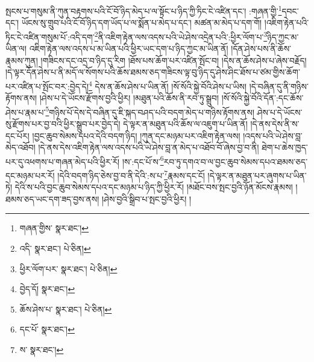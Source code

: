 སྤངས་པ་གསུམ་ནི་ཀུན་བརྟགས་པའི་ངོ་བོ་ཉིད་མེད་པ་ལ་སྟོང་པ་ཉིད་ཀྱི་ཏིང་ངེ་འཛིན་དང་། :གཞན་གྱི་\footnote{གཞན་གྱིས་  སྣར་ཐང་། }དབང་དང་། ཡོངས་སུ་གྲུབ་པའི་ངོ་བོ་ཉིད་དག་ཡོད་པ་ལ་སྨོན་པ་མེད་པ་དང་། མཚན་མ་མེད་པ་དག་གོ། །འཇིག་རྟེན་པའི་ཏིང་ངེ་འཛིན་གསུམ་པོ་:འདི་དག་\footnote{འདི་  སྣར་ཐང་།  པེ་ཅིན། }ནི་འཇིག་རྟེན་ལས་འདས་པའི་ཡེ་ཤེས་འདྲེན་པའི་:ཕྱིར་ལོག་པ་\footnote{ཕྱིར་ལོག་པར་  སྣར་ཐང་།  པེ་ཅིན། }ཉིད་ཀྱང་མ་ཡིན་ལ། འཇིག་རྟེན་ལས་འདས་པ་མ་ཡིན་པའི་ཕྱིར་ཡང་དག་པ་ཉིད་ཀྱང་མ་ཡིན་ནོ། །དོན་ཤེས་པས་ནི་ཆོས་རྣམས་ཀུན། །གཟིངས་དང་འདྲ་བ་ཉིད་དུ་རིག །ཐོས་པས་ཆོག་པར་འཛིན་སྤོང་བ། །དེས་ན་ཆོས་ཤེས་པ་ཞེས་བརྗོད། །དེ་ལྟར་དོན་ཤེས་པ་ནི་མདོ་ལ་སོགས་པའི་ཆོས་ཐམས་ཅད་གཟིངས་ལྟ་བུ་ཉིད་དུ་ཤེས་ཤིང་ཐོས་པ་ཙམ་གྱིས་ཆོག་པར་འཛིན་པ་སྤོང་བར་:བྱེད་དེ།\footnote{བྱེད་དོ།  སྣར་ཐང་། } དེས་ན་ཆོས་ཤེས་པ་ཡིན་ནོ། །སོ་སོའི་སྐྱེ་བོའི་ཤེས་པ་ཡིས། །དེ་བཞིན་དུ་ནི་གཉིས་རྟོགས་ནས། །ཤེས་པ་དེ་ཡོངས་རྫོགས་བྱའི་ཕྱིར། །མཐུན་པའི་ཆོས་ནི་རབ་ཏུ་སྒྲུབ། །སོ་སོའི་སྐྱེ་བོའི་དོན་:དང་ཆོས་ཤེས་པ་རྣམ་པ་\footnote{ཆོས་ཤེས་པ་  སྣར་ཐང་།  པེ་ཅིན། }གཉིས་པོ་དེས་དེ་བཞིན་དུ་ཇི་སྐད་བཤད་པའི་བདག་མེད་པ་གཉིས་རྟོགས་ནས། ཤེས་པ་དེ་ཡོངས་སུ་རྫོགས་པར་བྱ་བའི་ཕྱིར་སྒྲུབ་པར་བྱེད་དེ། དེ་ལྟར་ན་མཐུན་པའི་ཆོས་ལ་འཇུག་པ་ཡིན་ནོ། །དེ་ནས་དེས་ནི་ས་དང་པོར། །བྱང་ཆུབ་སེམས་དཔའ་དེའི་བདག་ཉིད། །ཀུན་དང་མཉམ་པར་འཇིག་རྟེན་ལས། །འདས་པའི་ཡེ་ཤེས་བླ་མེད་འཐོབ། །དེ་ནས་དེས་འཇིག་རྟེན་ལས་འདས་པའི་ཡེ་ཤེས་བླ་ན་མེད་པ་འཐོབ་བོ་ཞེས་བྱ་བ་ནི། ཐེག་པ་ཆེས་ཁྱད་པར་དུ་འཕགས་པ་གཞན་མེད་པའི་ཕྱིར་རོ། །ས་:དང་པོ་ས་\footnote{དང་པོ་  སྣར་ཐང་། }རབ་ཏུ་དགའ་བ་ལ་བྱང་ཆུབ་སེམས་དཔའ་ཐམས་ཅད་དང་མཉམ་པར་རོ། །དེའི་བདག་ཉིད་ཅེས་བྱ་བ་ནི་དེའི་:ས་པ་\footnote{ས་  སྣར་ཐང་། }རྣམས་དང་ངོ། །དེ་ལྟར་ན་མཐུན་པར་ཞུགས་པ་ཡིན་ཏེ། དེའི་ས་པའི་བྱང་ཆུབ་སེམས་དཔའ་དང་མཉམ་པ་ཉིད་ཀྱི་ཕྱིར་རོ། །མཐོང་བས་སྤང་བྱའི་ཉོན་མོངས་རྣམས། །ཐམས་ཅད་ཡང་དག་ཟད་བྱས་ནས། །ཤེས་བྱའི་སྒྲིབ་པ་སྤང་བྱའི་ཕྱིར། །

